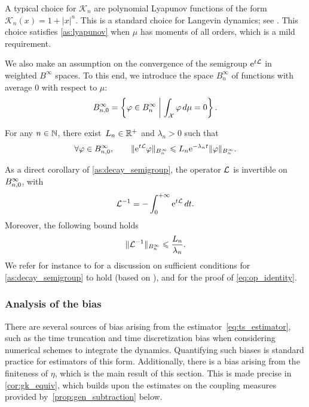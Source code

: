 A typical choice for $\mathcal{K}_n$ are polynomial Lyapunov functions of the form $\mathcal{K}_n(x) = 1+|x|^n$. This is a standard choice for Langevin dynamics; see \cite{mattingly2002,talay2002}. This choice satisfies \cref{as:lyapunov} when $\mu$ has moments of all orders, which is a mild requirement.

We also make an assumption on the convergence of the semigroup $\mathrm{e}^{t\mathcal{L}}$ in weighted $B^\infty$ spaces. To this end, we introduce the space $B^\infty_n$ of functions with average 0 with respect to $\mu$:
%
\begin{equation}
    B_{n,0}^{\infty} = \left\{\varphi \in B^\infty_n \; \middle| \; \int_\mathcal{X} \varphi \, d\mu = 0\right\}.
\end{equation}
%

\begin{assumption}
	\label{as:decay_semigroup}
	For any $n\in\mathbb{N}$, there exist~$L_n \in \mathbb{R}^+$ and $\lambda_n>0$ such that
	\begin{equation}
		\forall \varphi\in B_{n,0}^{\infty}, \qquad \|\mathrm{e}^{t\mathcal{L}}\varphi\|_{B^\infty_n} \leqslant L_n\mathrm{e}^{-\lambda_n t}\lVert\varphi\rVert_{B^\infty_n}.
	\label{eq:decay}
	\end{equation}
\end{assumption}
%

As a direct corollary of \cref{as:decay_semigroup}, the operator $\mathcal{L}$ is invertible on $B_{n,0}^{\infty}$, with
%
\begin{equation}
	\mathcal{L}^{-1} = -\int_0^{+\infty} \mathrm{e}^{t\mathcal{L}} \, dt.
	\label{eq:op_identity}
\end{equation}
%
Moreover, the following bound holds
%
\begin{equation}
	\lVert\mathcal{L}^{-1}\rVert_{B^\infty_n} \leqslant \frac{L_n}{\lambda_n}.
	\label{eq:Linv_bound}
\end{equation}
%
We refer for instance to \cite[Section 2]{lelievre2016} for a discussion on sufficient conditions for \cref{as:decay_semigroup} to hold (based on \cite{reybellet2006,hairer2011}), and for the proof of \eqref{eq:op_identity}. 

\subsubsection{Analysis of the bias}
\label{subsubsec:bias_analysis}
%
There are several sources of bias arising from the estimator~\eqref{eq:ts_estimator}, such as the time truncation and time discretization bias when considering numerical schemes to integrate the dynamics. Quantifying such biases is standard practice for estimators of this form. Additionally, there is a bias arising from the finiteness of $\eta$, which is the main result of this section. This is made precise in \cref{cor:gk_equiv}, which builds upon the estimates on the coupling measures provided by~\cref{prop:gen_subtraction} below. 

